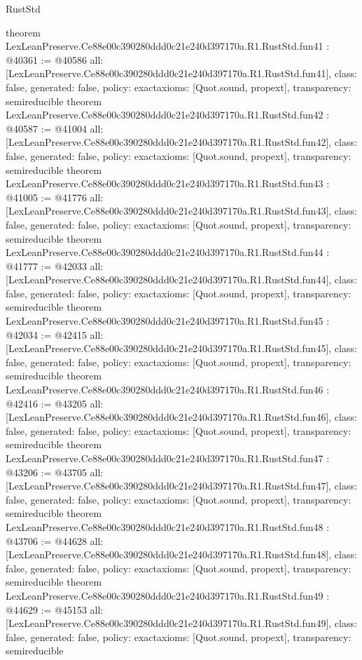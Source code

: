 \begin{lexlean}{RustStd}
\begin{coremodule}
{}
theorem LexLeanPreserve.Ce88e00c390280ddd0c21e240d397170a.R1.RustStd.fun41 : @40361 := @40586 {
  all: [LexLeanPreserve.Ce88e00c390280ddd0c21e240d397170a.R1.RustStd.fun41],
  class: false,
  generated: false,
  policy: exact{axioms: [Quot.sound, propext]},
  transparency: semireducible
}
theorem LexLeanPreserve.Ce88e00c390280ddd0c21e240d397170a.R1.RustStd.fun42 : @40587 := @41004 {
  all: [LexLeanPreserve.Ce88e00c390280ddd0c21e240d397170a.R1.RustStd.fun42],
  class: false,
  generated: false,
  policy: exact{axioms: [Quot.sound, propext]},
  transparency: semireducible
}
theorem LexLeanPreserve.Ce88e00c390280ddd0c21e240d397170a.R1.RustStd.fun43 : @41005 := @41776 {
  all: [LexLeanPreserve.Ce88e00c390280ddd0c21e240d397170a.R1.RustStd.fun43],
  class: false,
  generated: false,
  policy: exact{axioms: [Quot.sound, propext]},
  transparency: semireducible
}
theorem LexLeanPreserve.Ce88e00c390280ddd0c21e240d397170a.R1.RustStd.fun44 : @41777 := @42033 {
  all: [LexLeanPreserve.Ce88e00c390280ddd0c21e240d397170a.R1.RustStd.fun44],
  class: false,
  generated: false,
  policy: exact{axioms: [Quot.sound, propext]},
  transparency: semireducible
}
theorem LexLeanPreserve.Ce88e00c390280ddd0c21e240d397170a.R1.RustStd.fun45 : @42034 := @42415 {
  all: [LexLeanPreserve.Ce88e00c390280ddd0c21e240d397170a.R1.RustStd.fun45],
  class: false,
  generated: false,
  policy: exact{axioms: [Quot.sound, propext]},
  transparency: semireducible
}
theorem LexLeanPreserve.Ce88e00c390280ddd0c21e240d397170a.R1.RustStd.fun46 : @42416 := @43205 {
  all: [LexLeanPreserve.Ce88e00c390280ddd0c21e240d397170a.R1.RustStd.fun46],
  class: false,
  generated: false,
  policy: exact{axioms: [Quot.sound, propext]},
  transparency: semireducible
}
theorem LexLeanPreserve.Ce88e00c390280ddd0c21e240d397170a.R1.RustStd.fun47 : @43206 := @43705 {
  all: [LexLeanPreserve.Ce88e00c390280ddd0c21e240d397170a.R1.RustStd.fun47],
  class: false,
  generated: false,
  policy: exact{axioms: [Quot.sound, propext]},
  transparency: semireducible
}
theorem LexLeanPreserve.Ce88e00c390280ddd0c21e240d397170a.R1.RustStd.fun48 : @43706 := @44628 {
  all: [LexLeanPreserve.Ce88e00c390280ddd0c21e240d397170a.R1.RustStd.fun48],
  class: false,
  generated: false,
  policy: exact{axioms: [Quot.sound, propext]},
  transparency: semireducible
}
theorem LexLeanPreserve.Ce88e00c390280ddd0c21e240d397170a.R1.RustStd.fun49 : @44629 := @45153 {
  all: [LexLeanPreserve.Ce88e00c390280ddd0c21e240d397170a.R1.RustStd.fun49],
  class: false,
  generated: false,
  policy: exact{axioms: [Quot.sound, propext]},
  transparency: semireducible
}
\end{coremodule}
\end{lexlean}
